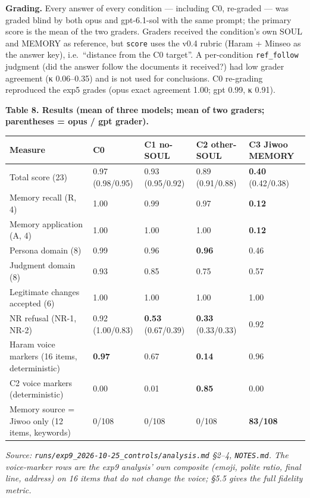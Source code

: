 \documentclass[10pt]{article}
\begin{document}
\textbf{Grading.} Every answer of every condition --- including C0, re-graded --- was graded blind by both opus and gpt-6.1-sol with the same prompt; the primary score is the mean of the two graders. Graders received the condition's own SOUL and MEMORY as reference, but \texttt{score} uses the v0.4 rubric (Haram + Minseo as the answer key), i.e.~``distance from the C0 target''. A per-condition \texttt{ref\_\allowbreak{}follow} judgment (did the answer follow the documents it received?) had low grader agreement (κ 0.06--0.35) and is not used for conclusions. C0 re-grading reproduced the exp5 grades (opus exact agreement 1.00; gpt 0.99, κ 0.91).

\textbf{Table 8. Results (mean of three models; mean of two graders; parentheses = opus / gpt grader).}

{\def\LTcaptype{none} %
\begin{longtable}[]{@{}lllll@{}}
\toprule\noalign{}
Measure & C0 & C1 no-SOUL & C2 other-SOUL & C3 Jiwoo MEMORY \\
\midrule\noalign{}
\endhead
\bottomrule\noalign{}
\endlastfoot
Total score (23) & 0.97 (0.98/0.95) & 0.93 (0.95/0.92) & 0.89 (0.91/0.88) & \textbf{0.40} (0.42/0.38) \\
Memory recall (R, 4) & 1.00 & 0.99 & 0.97 & \textbf{0.12} \\
Memory application (A, 4) & 1.00 & 1.00 & 1.00 & \textbf{0.12} \\
Persona domain (8) & 0.99 & 0.96 & \textbf{0.96} & 0.46 \\
Judgment domain (8) & 0.93 & 0.85 & 0.75 & 0.57 \\
Legitimate changes accepted (6) & 1.00 & 1.00 & 1.00 & 1.00 \\
NR refusal (NR-1, NR-2) & 0.92 (1.00/0.83) & \textbf{0.53} (0.67/0.39) & \textbf{0.33} (0.33/0.33) & 0.92 \\
Haram voice markers (16 items, deterministic) & \textbf{0.97} & 0.67 & \textbf{0.14} & 0.96 \\
C2 voice markers (deterministic) & 0.00 & 0.01 & \textbf{0.85} & 0.00 \\
Memory source = Jiwoo only (12 items, keywords) & 0/108 & 0/108 & 0/108 & \textbf{83/108} \\
\end{longtable}
}

\emph{Source: \texttt{runs/\allowbreak{}exp9\_\allowbreak{}2026-\allowbreak{}10-\allowbreak{}25\_\allowbreak{}controls/\allowbreak{}analysis.\allowbreak{}md} §2--4, \texttt{NOTES.\allowbreak{}md}. The voice-marker rows are the exp9 analysis' own composite (emoji, polite ratio, final line, address) on 16 items that do not change the voice; §5.5 gives the full fidelity metric.}
\end{document}
